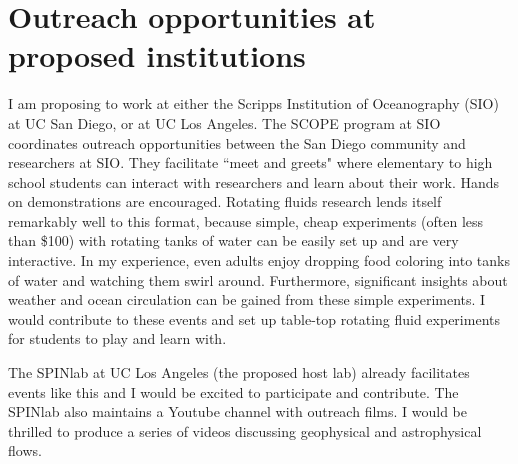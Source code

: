 \documentclass{article}
\begin{document}
\section*{Outreach opportunities at proposed institutions}
I am proposing to work at either the Scripps Institution of Oceanography (SIO) at UC San Diego, or at UC Los Angeles. The SCOPE program at SIO coordinates outreach opportunities between the San Diego community and researchers at SIO. They facilitate ``meet and greets" where elementary to high school students can interact with researchers and learn about their work.  Hands on demonstrations are encouraged.
Rotating fluids research lends itself remarkably well to this format, because simple, cheap experiments (often less than \$100) with rotating tanks of water can be easily set up and are very interactive. In my experience, even adults enjoy dropping food coloring into tanks of water and watching them swirl around. Furthermore, significant insights about weather and ocean circulation can be gained from these simple  experiments. I would contribute to these events and set up table-top rotating fluid experiments for students to play and learn with.

The SPINlab at UC Los Angeles (the proposed host lab) already facilitates events like this and I would be excited to participate and contribute. The SPINlab also maintains a Youtube channel with outreach films. I would be thrilled to produce a series of videos discussing geophysical and astrophysical flows. 
\printbibliography
\end{document}
